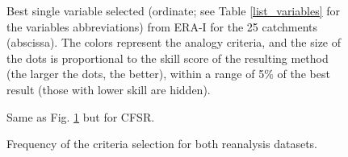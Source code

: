\documentclass[draft]{agujournal2019}
\begin{document}
\begin{figure}[hbt]
	\noindent{}
	\caption{Best single variable selected (ordinate; see Table \ref{list_variables} for the variables abbreviations) from ERA-I for the 25 catchments (abscissa). The colors represent the analogy criteria, and the size of the dots is proportional to the skill score of the resulting method (the larger the dots, the better), within a range of 5\% of the best result (those with lower skill are hidden).}
	\label{fig_best_era_int}
\end{figure}

\begin{figure}[hbt]
	\noindent{}
	\caption{Same as Fig. \ref{fig_best_era_int} but for CFSR.}
	\label{fig_best_cfsr}
\end{figure}

\begin{figure}[hbt]
	\noindent{}
	\caption{Frequency of the criteria selection for both reanalysis datasets.}
	\label{fig_criteria}
\end{figure}
\end{document}
